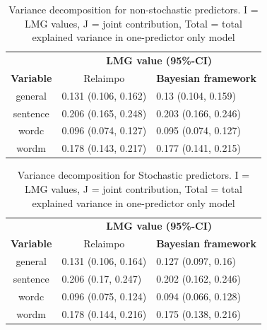 \documentclass[11pt,a4paper,twoside]{book}
\begin{document}
\begin{table}[h]
\caption{Variance decomposition for non-stochastic predictors. I = LMG values, J = joint contribution, Total = total explained variance in one-predictor only model}
\centering
\begin{tabular}{cll}
   \toprule
   &\multicolumn{2}{c}{\textbf{LMG value (95\%-CI)}} \\
 \textbf{Variable} & \multicolumn{1}{c}{Relaimpo} & \textbf{Bayesian framework}  \\
  \hline
general & 0.131 (0.106, 0.162)  & 0.13 (0.104, 0.159)  \\ 
sentence & 0.206 (0.165, 0.248)  & 0.203 (0.166, 0.246)   \\ 
wordc & 0.096 (0.074, 0.127)  & 0.095 (0.074, 0.127)  \\ 
wordm & 0.178 (0.143, 0.217) & 0.177 (0.141, 0.215)  \\ 
   \bottomrule
\end{tabular}
\label{tbl:empirical.relaimp.comp}
\end{table}





\begin{table}[h]
\caption{Variance decomposition for Stochastic predictors. I = LMG values, J = joint contribution, Total = total explained variance in one-predictor only model}
\centering
\begin{tabular}{cll}
   \toprule
   &\multicolumn{2}{c}{\textbf{LMG value (95\%-CI)}} \\
 \textbf{Variable} & \multicolumn{1}{c}{Relaimpo} & \textbf{Bayesian framework}  \\
  \hline
general & 0.131 (0.106, 0.164)  &  0.127 (0.097, 0.16)  \\ 
sentence & 0.206 (0.17, 0.247)  &  0.202 (0.162, 0.246)   \\ 
wordc & 0.096 (0.075, 0.124)  &  0.094 (0.066, 0.128)  \\ 
wordm & 0.178 (0.144, 0.216) &  0.175 (0.138, 0.216) \\ 
   \bottomrule
\end{tabular}
\label{tbl:empirical.relaimp.comp.stoch}
\end{table}




 

\end{document}
